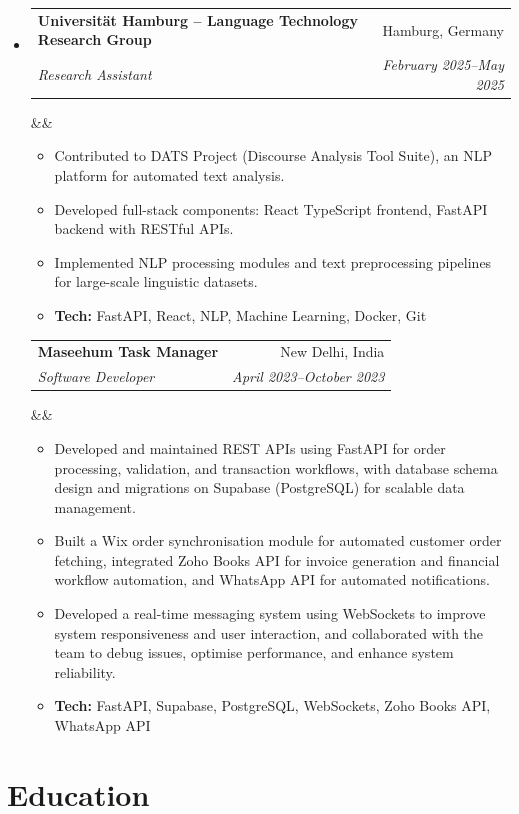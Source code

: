 \documentclass[a4paper,11pt]{article}
\makeatletter
\newcommand{\cvitem}[1]{\item\small{#1}}
\newcommand{\cvsubheading}[5][]{%
  \vspace{2pt}%
  \hbadness=10000%
  \begin{tabular*}{\textwidth}[t]{@{}l@{\extracolsep{\fill}}r@{}}
    \textbf{#2} & #3 \\
    \textit{\small #4} & \textit{\small #5} \\
  \end{tabular*}%
  \ifx&#1&\else\vspace{2pt}\\{\small #1}\fi%
  \vspace{-4pt}%
}
\newenvironment{cvitemlist}
  {\begin{itemize}[leftmargin=0.4cm, topsep=1pt, itemsep=0pt, parsep=0pt, label=\textbullet]}
  {\end{itemize}}
\newenvironment{cvsection}
  {\begin{itemize}[leftmargin=0cm, label={}, topsep=0pt, itemsep=-2pt]}
  {\end{itemize}}
\makeatother
\begin{document}
\begin{cvsection}
  \item
  \cvsubheading
    {Universität Hamburg -- Language Technology Research Group}{Hamburg, Germany}
    {Research Assistant}{February 2025--May 2025}
  \begin{cvitemlist}
    \cvitem{Contributed to DATS Project (Discourse Analysis Tool Suite), an NLP platform for automated text analysis.}
    \cvitem{Developed full-stack components: React TypeScript frontend, FastAPI backend with RESTful APIs.}
    \cvitem{Implemented NLP processing modules and text preprocessing pipelines for large-scale linguistic datasets.}
    \cvitem{\textbf{Tech:} FastAPI, React, NLP, Machine Learning, Docker, Git}
  \end{cvitemlist}

  \cvsubheading{Maseehum Task Manager}{New Delhi, India}{Software Developer}{April 2023--October 2023}
  \begin{cvitemlist}
    \cvitem{Developed and maintained REST APIs using FastAPI for order processing, validation, and transaction workflows, with database schema design and migrations on Supabase (PostgreSQL) for scalable data management.}
    \cvitem{Built a Wix order synchronisation module for automated customer order fetching, integrated Zoho Books API for invoice generation and financial workflow automation, and WhatsApp API for automated notifications.}
    \cvitem{Developed a real-time messaging system using WebSockets to improve system responsiveness and user interaction, and collaborated with the team to debug issues, optimise performance, and enhance system reliability.}
    \cvitem{\textbf{Tech:} FastAPI, Supabase, PostgreSQL, WebSockets, Zoho Books API, WhatsApp API}
  \end{cvitemlist}

\end{cvsection}

\section{Education}
\end{document}
